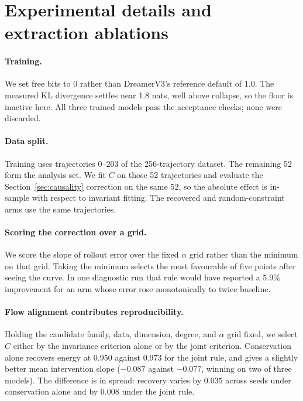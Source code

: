 \appendix

\section{Experimental details and extraction ablations}
\label{sec:details}

\paragraph{Training.} We set free bits to 0 rather than DreamerV3's reference default of 1.0. The
measured KL divergence settles near 1.8 nats, well above collapse, so the floor is inactive here. All
three trained models pass the acceptance checks; none were discarded.

\paragraph{Data split.} Training uses trajectories 0--203 of the 256-trajectory dataset. The
remaining 52 form the analysis set. We fit $C$ on those 52 trajectories and evaluate the
Section~\ref{sec:causality} correction on the same 52, so the absolute effect is in-sample with
respect to invariant fitting. The recovered and random-constraint arms use the same trajectories.

\paragraph{Scoring the correction over a grid.} We score the slope of rollout error over the fixed
$\alpha$ grid rather than the minimum on that grid. Taking the minimum selects the most favourable of
five points after seeing the curve. In one diagnostic run that rule would have reported a 5.9\%
improvement for an arm whose error rose monotonically to twice baseline.

\paragraph{Flow alignment contributes reproducibility.} Holding the candidate family, data,
dimension, degree, and $\alpha$ grid fixed, we select $C$ either by the invariance criterion alone or
by the joint criterion. Conservation alone recovers energy at $0.950$ against $0.973$ for the joint
rule, and gives a slightly better mean intervention slope ($-0.087$ against $-0.077$, winning on two
of three models). The difference is in spread: recovery varies by $0.035$ across seeds under
conservation alone and by $0.008$ under the joint rule.

